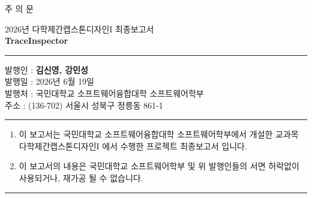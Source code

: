 
\begin{titlepage}
\thispagestyle{empty}

\centering

\vspace{1cm}

\Huge 주 의 문

\vspace{2.5cm}


\begin{minipage}{0.8\textwidth}
    \large 2026년 다학제간캡스톤디자인I 최종보고서 \\
    \textbf{TraceInspector} \\
    \vspace{0.2cm}
    \rule{\linewidth}{0.8pt} \par
    \vspace{0.2cm}
    \raggedright
    발행인 : \textbf{김신영, 강민성} \\
    발행일 : 2026년 6월 19일 \\
    발행처 : 국민대학교 소프트웨어융합대학 소프트웨어학부 \\
    주소 : (136-702) 서울시 성북구 정릉동 861-1 \\
    \vspace{0.2cm}
    \rule{\linewidth}{0.8pt} \par
    \vspace{0.2cm}
    \begin{enumerate}
        \item 이 보고서는 국민대학교 소프트웨어융합대학 소프트웨어학부에서 개설한 교과목 다학제간캡스톤디자인I 에서 수행한 프로젝트 최종보고서 입니다.
        \item 이 보고서의 내용은 국민대학교 소프트웨어학부 및 위 발행인들의 서면 허락없이 사용되거나, 재가공 될 수 없습니다.
    \end{enumerate}
    \rule{\linewidth}{0.8pt} \par
\end{minipage} \par
\vspace{1cm}
\end{titlepage}